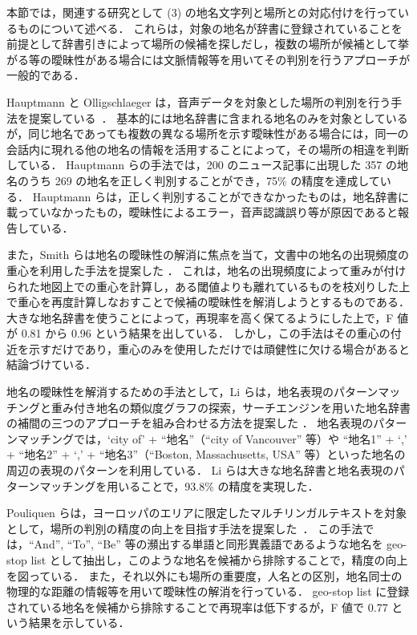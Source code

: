 \documentclass[japanese]{jnlp_1.4}
\begin{document}
本節では，関連する研究として (3) の地名文字列と場所との対応付けを行っているものについて述べる．
これらは，対象の地名が辞書に登録されていることを前提として辞書引きによって場所の候補を探しだし，複数の場所が候補として挙がる等の曖昧性がある場合には文脈情報等を用いてその判別を行うアプローチが一般的である．

Hauptmann と Olligschlaeger は，音声データを対象とした場所の判別を行う手法を提案している~\cite{Hauptmann99,Olligschlaeger99}．
基本的には地名辞書に含まれる地名のみを対象としているが，同じ地名であっても複数の異なる場所を示す曖昧性がある場合には，同一の会話内に現れる他の地名の情報を活用することによって，その場所の相違を判断している．
Hauptmann らの手法では，200 のニュース記事に出現した 357 の地名のうち 269 の地名を正しく判別することができ，75\% の精度を達成している．
Hauptmann らは，正しく判別することができなかったものは，地名辞書に載っていなかったもの，曖昧性によるエラー，音声認識誤り等が原因であると報告している．

また，Smith らは地名の曖昧性の解消に焦点を当て，文書中の地名の出現頻度の重心を利用した手法を提案した \cite{Smith2001}．
これは，地名の出現頻度によって重みが付けられた地図上での重心を計算し，ある閾値よりも離れているものを枝刈りした上で重心を再度計算しなおすことで候補の曖昧性を解消しようとするものである．
大きな地名辞書を使うことによって，再現率を高く保てるようにした上で，F 値が 0.81 から 0.96 という結果を出している．
しかし，この手法はその重心の付近を示すだけであり，重心のみを使用しただけでは頑健性に欠ける場合があると結論づけている．

地名の曖昧性を解消するための手法として，Li らは，地名表現のパターンマッチングと重み付き地名の類似度グラフの探索，サーチエンジンを用いた地名辞書の補間の三つのアプローチを組み合わせる方法を提案した \cite{Li2002}．
地名表現のパターンマッチングでは，`city of' + ``地名''（``city of Vancouver'' 等）や ``地名1'' + `,' + ``地名2'' + `,' + ``地名3''（``Boston, Massachusetts, USA'' 等）といった地名の周辺の表現のパターンを利用している．
Li らは大きな地名辞書と地名表現のパターンマッチングを用いることで，93.8\% の精度を実現した．

Pouliquen らは，ヨーロッパのエリアに限定したマルチリンガルテキストを対象として，場所の判別の精度の向上を目指す手法を提案した~\cite{Pouliquen06}．
この手法では，``And'', ``To'', ``Be'' 等の瀕出する単語と同形異義語であるような地名を geo-stop list として抽出し，このような地名を候補から排除することで，精度の向上を図っている．
また，それ以外にも場所の重要度，人名との区別，地名同士の物理的な距離の情報等を用いて曖昧性の解消を行っている．
geo-stop list に登録されている地名を候補から排除することで再現率は低下するが，F 値で 0.77 という結果を示している．
\end{document}
